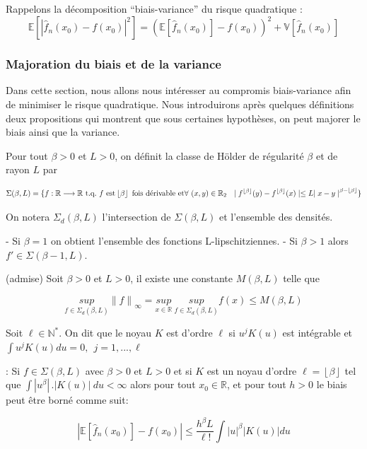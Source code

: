 \documentclass[
]{book}
\theoremstyle{definition}
\theoremstyle{definition}
\theoremstyle{definition}
\theoremstyle{definition}
\theoremstyle{remark}
\begin{document}
Rappelons la décomposition ``biais-variance'' du risque quadratique :
\[
\mathbb{E}[|\hat {f}_n(x_0) - f(x_0)|^2] = (\mathbb{E}[\hat {f}_n(x_0)] - f(x_0))^2 + \mathbb{V}[\hat {f}_n(x_0)]
\]

\hypertarget{majoration-du-biais-et-de-la-variance}{%
\subsubsection{Majoration du biais et de la variance}\label{majoration-du-biais-et-de-la-variance}}

Dans cette section, nous allons nous intéresser au compromis biais-variance afin de minimiser le risque quadratique.
Nous introduirons après quelques définitions deux propositions qui montrent que sous certaines hypothèses, on peut majorer le biais ainsi que la variance.\newline

\begin{dfn} Pour tout $\beta > 0$ et $L > 0$, on définit la classe de Hölder de régularité $\beta$ et de rayon $L$ par

$$
  \Sigma(\beta,L)={\{f:\mathbb{R} \longrightarrow \mathbb{R}\ \text{t.q.}\ f\ \text{est} \left\lfloor{\beta}\right\rfloor\ \text{fois dérivable et}   \\
  \forall\ (x,y) \in \mathbb{R}_2\ \ \mid f^{\left\lfloor{\beta}\right\rfloor}(y)-f^{\left\lfloor{\beta}\right\rfloor}(x)\mid \leq L{\mid x-y\mid}^{\beta - \left\lfloor{\beta}\right\rfloor}\}}
$$

On notera $\Sigma_d(\beta,L)$ l'intersection de $\Sigma(\beta,L)$ et l'ensemble des densités.

\end{dfn}
\begin{rem} 
- Si $\beta = 1$ on obtient l'ensemble des fonctions L-lipschitziennes.\newline
- Si $\beta > 1$ alors $f'\in \Sigma(\beta-1,L)$.
\end{rem}
\begin{prop} (admise) Soit $\beta > 0$ et $L > 0$, il existe une constante $M(\beta, L)$ telle que

$$
\underset{f \in \Sigma_d(\beta,L)}{sup}{\parallel f \parallel}_{\infty}= \underset{x \in \mathbb{R}}{sup}\ \underset{f \in \Sigma_d(\beta,L)}{sup}f(x) \leq M(\beta,L)
$$
\end{prop}

\begin{dfn} Soit $\ell \in \mathbb{N^*}$. On dit que le noyau $K$ est d'ordre $\ell$ si $u^jK(u)$ est intégrable et 
$\int u^jK(u)du =  0,\   \ j = {1,...,\ell}$

\end{dfn}
\begin{prop}: Si $f \in \Sigma(\beta,L)$ avec $\beta > 0$ et $L > 0$ et si $K$ est un noyau d'ordre $\ell = \left\lfloor{\beta}\right\rfloor$ tel que $\int |{u}^{\beta}|\,.|{K(u)}|~du < \infty$ alors pour tout $x_0 \in \mathbb{R}$, et pour tout $h>0$ le biais peut être borné comme suit:

$$
|\mathbb{E}[\hat{f}_n(x_0)] - f(x_0)|\leqslant \frac{h^{\beta}L}{\ell!}\int|u|^{\beta}|K(u)|du
$$
\end{prop}
\end{document}
